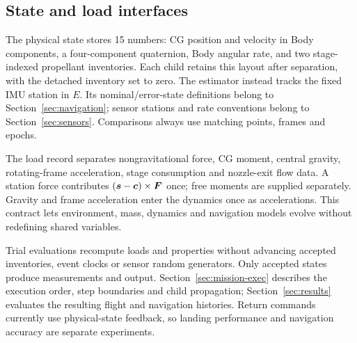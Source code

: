 \subsection{State and load interfaces}
The physical state stores 15 numbers: CG position and velocity in Body components, a four-component quaternion, Body angular rate, and two stage-indexed propellant inventories. Each child retains this layout after separation, with the detached inventory set to zero. The estimator instead tracks the fixed IMU station in $E$. Its nominal/error-state definitions belong to Section~\ref{sec:navigation}; sensor stations and rate conventions belong to Section~\ref{sec:sensors}. Comparisons always use matching points, frames and epochs.

The load record separates nongravitational force, CG moment, central gravity, rotating-frame acceleration, stage consumption and nozzle-exit flow data. A station force contributes $(\boldsymbol{s}-\boldsymbol{c})\times\boldsymbol{F}$ once; free moments are supplied separately. Gravity and frame acceleration enter the dynamics once as accelerations. This contract lets environment, mass, dynamics and navigation models evolve without redefining shared variables.

Trial evaluations recompute loads and properties without advancing accepted inventories, event clocks or sensor random generators. Only accepted states produce measurements and output. Section~\ref{sec:mission-exec} describes the execution order, step boundaries and child propagation; Section~\ref{sec:results} evaluates the resulting flight and navigation histories. Return commands currently use physical-state feedback, so landing performance and navigation accuracy are separate experiments.
